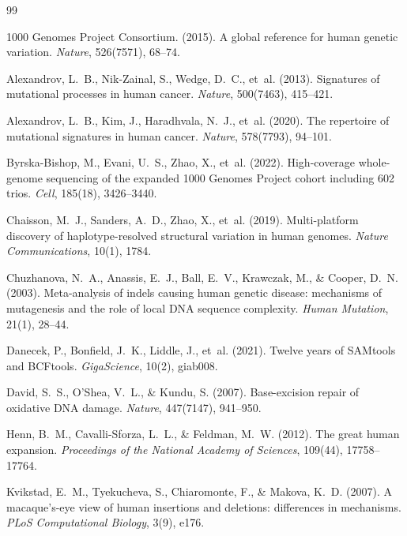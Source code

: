 \documentclass[11pt,a4paper]{article}
\begin{document}
\begin{thebibliography}{99}

{1000 Genomes Project Consortium}. (2015). A global reference for human genetic variation. \textit{Nature}, 526(7571), 68--74.

Alexandrov, L.~B., Nik-Zainal, S., Wedge, D.~C., et~al. (2013). Signatures of mutational processes in human cancer. \textit{Nature}, 500(7463), 415--421.

Alexandrov, L.~B., Kim, J., Haradhvala, N.~J., et~al. (2020). The repertoire of mutational signatures in human cancer. \textit{Nature}, 578(7793), 94--101.

Byrska-Bishop, M., Evani, U.~S., Zhao, X., et~al. (2022). High-coverage whole-genome sequencing of the expanded 1000 Genomes Project cohort including 602 trios. \textit{Cell}, 185(18), 3426--3440.

Chaisson, M.~J., Sanders, A.~D., Zhao, X., et~al. (2019). Multi-platform discovery of haplotype-resolved structural variation in human genomes. \textit{Nature Communications}, 10(1), 1784.

Chuzhanova, N.~A., Anassis, E.~J., Ball, E.~V., Krawczak, M., \& Cooper, D.~N. (2003). Meta-analysis of indels causing human genetic disease: mechanisms of mutagenesis and the role of local DNA sequence complexity. \textit{Human Mutation}, 21(1), 28--44.

Danecek, P., Bonfield, J.~K., Liddle, J., et~al. (2021). Twelve years of SAMtools and BCFtools. \textit{GigaScience}, 10(2), giab008.

David, S.~S., O'Shea, V.~L., \& Kundu, S. (2007). Base-excision repair of oxidative DNA damage. \textit{Nature}, 447(7147), 941--950.

Henn, B.~M., Cavalli-Sforza, L.~L., \& Feldman, M.~W. (2012). The great human expansion. \textit{Proceedings of the National Academy of Sciences}, 109(44), 17758--17764.

Kvikstad, E.~M., Tyekucheva, S., Chiaromonte, F., \& Makova, K.~D. (2007). A macaque's-eye view of human insertions and deletions: differences in mechanisms. \textit{PLoS Computational Biology}, 3(9), e176.


\end{thebibliography}
\end{document}
